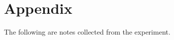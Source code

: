 \documentclass[12pt,titlepage=false]{scrartcl}
\begin{document}
\section{Appendix}
\label{sec:appendix}
The following are notes collected from the experiment.

\begin{multicols}{2}
    \centering
\end{multicols}
\end{document}
